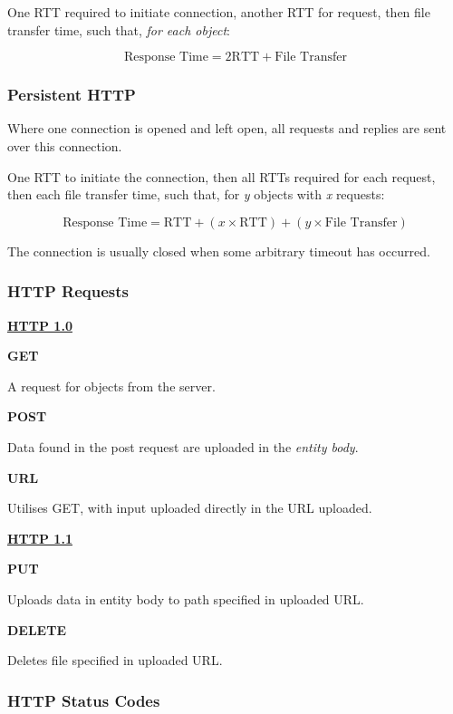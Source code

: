 \documentclass{article}
\begin{document}
One RTT required to initiate connection, another RTT for request, then file transfer time, such that, \textit{for each object}:

\[ \text{Response Time} = 2\text{RTT} + \text{File Transfer} \]

\subsubsection{Persistent HTTP}

Where one connection is opened and left open, all requests and replies are sent over this connection.

One RTT to initiate the connection, then all RTTs required for each request, then each file transfer time, such that, for \textit{y} objects with \textit{x} requests:

\[ \text{Response Time} = \text{RTT} + (x\times\text{RTT}) + (y\times\text{File Transfer})\]

The connection is usually closed when some arbitrary timeout has occurred.

\subsubsection{HTTP Requests}

\underline{\textbf{HTTP 1.0}}

\textbf{GET}

A request for objects from the server.

\textbf{POST}

Data found in the post request are uploaded in the \textit{entity body}.

\textbf{URL}

Utilises GET, with input uploaded directly in the URL uploaded.

\textbf{\underline{HTTP 1.1}}

\textbf{PUT}

Uploads data in entity body to path specified in uploaded URL.

\textbf{DELETE}

Deletes file specified in uploaded URL.

\subsubsection{HTTP Status Codes}
\end{document}
